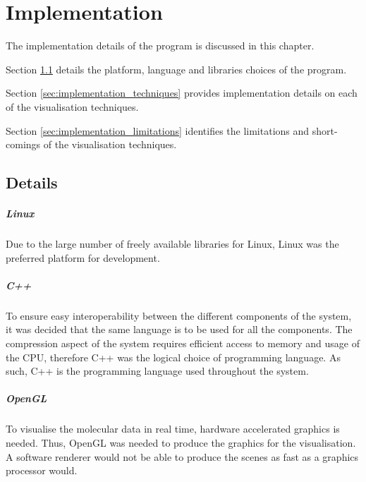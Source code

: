\graphicspath{{./implementation/}}

\chapter{Implementation}
\label{cha:implementation}

The implementation details of the program is discussed in this chapter.

Section \ref{sec:implementation_details} details the platform, language and
libraries choices of the program.

Section \ref{sec:implementation_techniques} provides implementation details on
each of the visualisation techniques.

Section \ref{sec:implementation_limitations} identifies the limitations and
short-comings of the visualisation techniques.

\section{Details}
\label{sec:implementation_details}

\paragraph{Linux}

Due to the large number of freely available libraries for Linux, Linux was the
preferred platform for development.


\paragraph{C++}

To ensure easy interoperability between the different components of the system,
it was decided that the same language is to be used for all the components. The
compression aspect of the system requires efficient access to memory and usage
of the CPU, therefore C++ was the logical choice of programming language. As
such, C++ is the programming language used throughout the system.


\paragraph{OpenGL}

To visualise the molecular data in real time, hardware accelerated graphics is
needed.  Thus, OpenGL \citep{OpenGL} was needed to produce the graphics for the
visualisation. A software renderer would not be able to produce the scenes as
fast as a graphics processor would.

